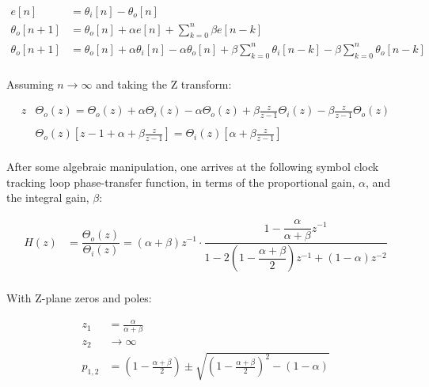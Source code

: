 \documentclass{article}
\begin{document}
\begin{align*}
   e[n] &= \theta_i[n] - \theta_o[n] \\
   \theta_o[n+1] &= \theta_o[n] + \alpha e[n] + \sum_{k=0}^{n}{\beta e[n-k]}\\
   \theta_o[n+1] &= \theta_o[n]
                  + \alpha\theta_i[n] - \alpha\theta_o[n]
                  + \beta\sum_{k=0}^{n}{\theta_i[n-k]}
                  - \beta\sum_{k=0}^{n}{\theta_o[n-k]}\\
\end{align*}

Assuming $n \rightarrow \infty$ and taking the Z transform:

\begin{align*}
    z&\Theta_o(z) = \Theta_o(z) + \alpha\Theta_i(z) - \alpha\Theta_o(z)
               + \beta\frac{z}{z-1}\Theta_i(z) - \beta\frac{z}{z-1}\Theta_o(z)\\
    \\
    &\Theta_o(z)\left[z - 1 + \alpha + \beta\frac{z}{z-1}\right]
     = \Theta_i(z)\left[\alpha + \beta\frac{z}{z-1}\right]\\
\end{align*}

After some algebraic manipulation, one arrives at the following symbol clock
tracking loop phase-transfer function, in terms of the proportional gain,
$\alpha$, and the integral gain, $\beta$:

\begin{align*}
   H(z) &= \dfrac {\Theta_o(z)}{\Theta_i(z)}
         = (\alpha + \beta)z^{-1} \cdot
          \dfrac{
                 1
                 - \dfrac{\alpha}{\alpha + \beta} z^{-1}
                }
                {
                 1
                 - 2 \left(1 - \dfrac{\alpha + \beta}{2}\right) z^{-1}
                 + (1 - \alpha) z^{-2}
                } \\
\end{align*}

With Z-plane zeros and poles:

\begin{align*}
    z_{1} &= \frac{\alpha}{\alpha+\beta} \\
    z_{2} &\rightarrow \infty \\
    p_{1,2} &= \left(1-\frac{\alpha+\beta}{2}\right) \pm
           \sqrt{\left(1-\frac{\alpha+\beta}{2}\right)^{2}
                 - \left(1-\alpha\right)}\\
\end{align*}
\end{document}
